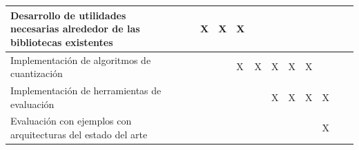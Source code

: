 \begin{table}[H]
{\begin{tabular}{|l|llllllllllll|}
    Desarrollo de utilidades necesarias alrededor de las bibliotecas existentes & \multicolumn{1}{l|}{}                          & \multicolumn{1}{l|}{}                          & \multicolumn{1}{l|}{X}                         & \multicolumn{1}{l|}{X}                         & \multicolumn{1}{l|}{X}                         & \multicolumn{1}{l|}{}                          & \multicolumn{1}{l|}{}                          & \multicolumn{1}{l|}{}                          & \multicolumn{1}{l|}{}                          & \multicolumn{1}{l|}{}                           & \multicolumn{1}{l|}{}                           &                                                 \\ \hline
    Implementación de algoritmos de cuantización                              & \multicolumn{1}{l|}{}                          & \multicolumn{1}{l|}{}                          & \multicolumn{1}{l|}{}                          & \multicolumn{1}{l|}{}                          & \multicolumn{1}{l|}{X}                         & \multicolumn{1}{l|}{X}                         & \multicolumn{1}{l|}{X}                         & \multicolumn{1}{l|}{X}                         & \multicolumn{1}{l|}{X}                         & \multicolumn{1}{l|}{}                           & \multicolumn{1}{l|}{}                           &                                                 \\ \hline
    Implementación de herramientas de evaluación                              & \multicolumn{1}{l|}{}                          & \multicolumn{1}{l|}{}                          & \multicolumn{1}{l|}{}                          & \multicolumn{1}{l|}{}                          & \multicolumn{1}{l|}{}                          & \multicolumn{1}{l|}{}                          & \multicolumn{1}{l|}{X}                         & \multicolumn{1}{l|}{X}                         & \multicolumn{1}{l|}{X}                         & \multicolumn{1}{l|}{X}                          & \multicolumn{1}{l|}{}                           &                                                 \\ \hline
    Evaluación con ejemplos con arquitecturas del estado del arte             & \multicolumn{1}{l|}{}                          & \multicolumn{1}{l|}{}                          & \multicolumn{1}{l|}{}                          & \multicolumn{1}{l|}{}                          & \multicolumn{1}{l|}{}                          & \multicolumn{1}{l|}{}                          & \multicolumn{1}{l|}{}                          & \multicolumn{1}{l|}{}                          & \multicolumn{1}{l|}{}                          & \multicolumn{1}{l|}{X}                          & \multicolumn{1}{l|}{}                           &                                                 \\ \hline

\end{tabular}}
\end{table}
